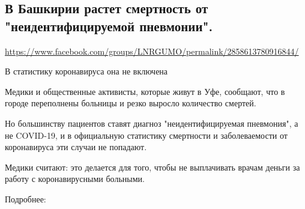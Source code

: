  
 
  
\subsection{В Башкирии растет смертность от "неидентифицируемой пневмонии".}
\label{sec:19_07_2020.fb.lnr.11}
\url{https://www.facebook.com/groups/LNRGUMO/permalink/2858613780916844/}

В статистику коронавируса она не включена

Медики и общественные активисты, которые живут в Уфе, сообщают, что в городе
переполнены больницы и резко выросло количество смертей.

Но большинству пациентов ставят диагноз "неидентифицируемая пневмония", а не
COVID-19, и в официальную статистику смертности и заболеваемости от
коронавируса эти случаи не попадают.

Медики считают: это делается для того, чтобы не выплачивать врачам деньги за
работу с коронавирусными больными.

Подробнее: 
